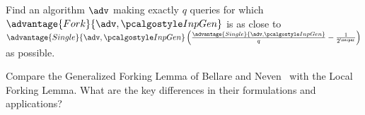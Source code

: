 \begin{exercise}[Optional]
  Find an algorithm $\adv$ making exactly $q$ queries for which $\advantage{Fork}{\adv, \algo{InpGen}}$ is as close to $\advantage{Single}{\adv, \algo{InpGen}} \left( \frac{\advantage{Single}{\adv, \algo{InpGen}}}{q} - \frac{1}{2^\secpar} \right)$ as possible.
\end{exercise}

\begin{exercise}[Optional]
  Compare the Generalized Forking Lemma of Bellare and Neven~\cite{CCS:BelNev06} with the Local Forking Lemma.
  What are the key differences in their formulations and applications?
\end{exercise}

